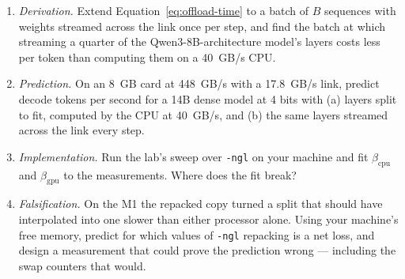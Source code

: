 \begin{enumerate}
\item \emph{Derivation.} Extend Equation~\ref{eq:offload-time} to a batch of
  $B$ sequences with weights streamed across the link once per step, and find
  the batch at which streaming a quarter of the Qwen3-8B-architecture model's layers costs
  less per token than computing them on a 40~GB/s CPU.
\item \emph{Prediction.} On an 8~GB card at 448~GB/s with a 17.8~GB/s link,
  predict decode tokens per second for a 14B dense model at 4 bits with
  (a) layers split to fit, computed by the CPU at 40~GB/s, and (b) the same
  layers streamed across the link every step.
\item \emph{Implementation.} Run the lab's sweep over \texttt{-ngl} on your
  machine and fit $\beta_{\mathrm{cpu}}$ and $\beta_{\mathrm{gpu}}$ to the
  measurements. Where does the fit break?
\item \emph{Falsification.} On the M1 the repacked copy turned a split that
  should have interpolated into one slower than either processor alone. Using
  your machine's free memory, predict for which values of \texttt{-ngl}
  repacking is a net loss, and design a measurement that could prove the
  prediction wrong --- including the swap counters that would.
\end{enumerate}
